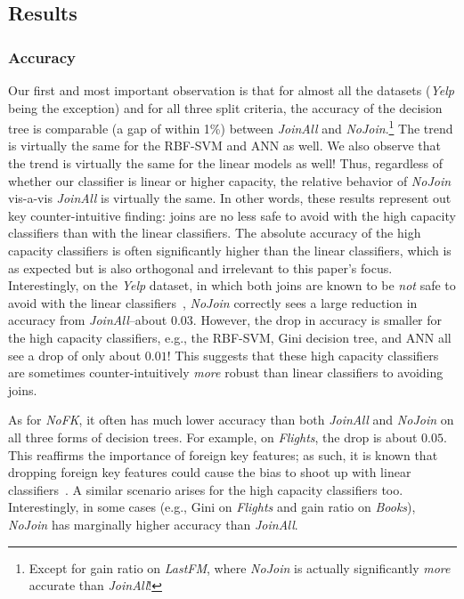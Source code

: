 \documentclass{vldb}
\begin{document}
\subsection{Results}

\vspace{-1mm}
\subsubsection*{Accuracy}
Our first and most important observation is that for almost all the datasets (\textit{Yelp} being the exception) and for all three split criteria, the accuracy of the 
decision tree is comparable (a gap of within 1\%) between \textit{JoinAll} and \textit{NoJoin}.\footnote{Except for gain ratio on \textit{LastFM}, where \textit{NoJoin}
is actually significantly \textit{more} accurate than \textit{JoinAll}!} The trend is virtually the same for the RBF-SVM and ANN as well. 
We also observe that the trend is virtually the same for the linear models as well! Thus, regardless of whether our classifier is linear or higher capacity, the relative 
behavior of \textit{NoJoin} vis-a-vis \textit{JoinAll} is virtually the same. 
In other words, these results represent out key counter-intuitive finding: joins are no less safe to avoid with the high capacity classifiers than with the 
linear classifiers. The absolute accuracy of the high capacity classifiers is often significantly higher than the linear classifiers, which is as expected but is 
also orthogonal and irrelevant to this paper's focus.
Interestingly, on the \textit{Yelp} dataset, in which both joins are known to be \textit{not} safe to avoid with the linear classifiers~\cite{hamlet}, \textit{NoJoin} 
correctly sees a large reduction in accuracy from \textit{JoinAll}--about $0.03$. 
However, the drop in accuracy is smaller for the high capacity classifiers, e.g., the RBF-SVM, Gini decision tree, and ANN all see a drop of only about $0.01$!
This suggests that these high capacity classifiers are sometimes counter-intuitively \textit{more} robust than linear classifiers to avoiding joins.

As for \textit{NoFK}, it often has much lower accuracy than both \textit{JoinAll} and \textit{NoJoin} on all three forms of decision trees. For example, on 
\textit{Flights}, the drop is about $0.05$. This reaffirms the importance of foreign key features; as such, it is known that dropping foreign key features could 
cause the bias to shoot up with linear classifiers~\cite{hamlet}. A similar scenario arises for the high capacity classifiers too.
Interestingly, in some cases (e.g., Gini on \textit{Flights} and gain ratio on \textit{Books}), \textit{NoJoin} has marginally higher accuracy than \textit{JoinAll}.
\end{document}
